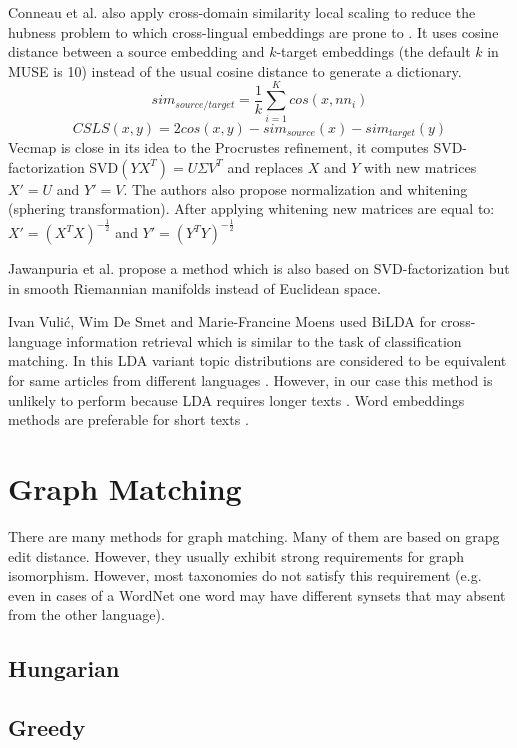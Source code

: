 \documentclass[11pt,a4paper]{article}
\begin{document}
Conneau et al. also apply cross-domain similarity local scaling to reduce the hubness problem to which cross-lingual embeddings are prone to \cite{dinu}. It uses cosine distance between a source embedding and $k$-target embeddings (the default $k$ in MUSE is 10) instead of the usual cosine distance to generate a dictionary.
$$sim_{source/target} = \dfrac{1}{k}\sum_{i=1}^Kcos(x, nn_i)$$
\small
$$CSLS(x,y) = 2cos(x,y) - sim_{source}(x)  - sim_{target}(y)$$
\normalsize
Vecmap \cite{vecmap} is close in its idea to the Procrustes refinement, it computes SVD-factorization SVD$(YX^T) = U\Sigma V^T$ and replaces $X$ and $Y$ with new matrices $X' = U$ and $Y' = V$. The authors also propose normalization and whitening (sphering transformation). After applying whitening new matrices are equal to:
$X' = (X^TX)^{-\tfrac{1}{2}}$ and $Y' = (Y^TY)^{-\tfrac{1}{2}}$

Jawanpuria et al. \cite{jawanpuria} propose a method which is also based on SVD-factorization but in smooth Riemannian manifolds instead of Euclidean space.

Ivan Vulić, Wim De Smet and Marie-Francine Moens  used BiLDA for cross-language information retrieval which is similar to the task of classification matching. In this LDA variant topic distributions are considered to be equivalent for same articles from different languages \cite{bilda}. However, in our case this method is unlikely to perform because LDA requires longer texts \cite{short-lda}. Word embeddings methods are preferable for short texts \cite{maslova-potapov}.
\section{Graph Matching}
There are many methods for graph matching. Many of them are based on grapg edit distance. However, they usually exhibit strong requirements for graph isomorphism. However, most taxonomies do not satisfy this requirement (e.g. even in cases of a WordNet one word may have different synsets that may absent from the other language).
\subsection{Hungarian}
\subsection{Greedy}
\end{document}
